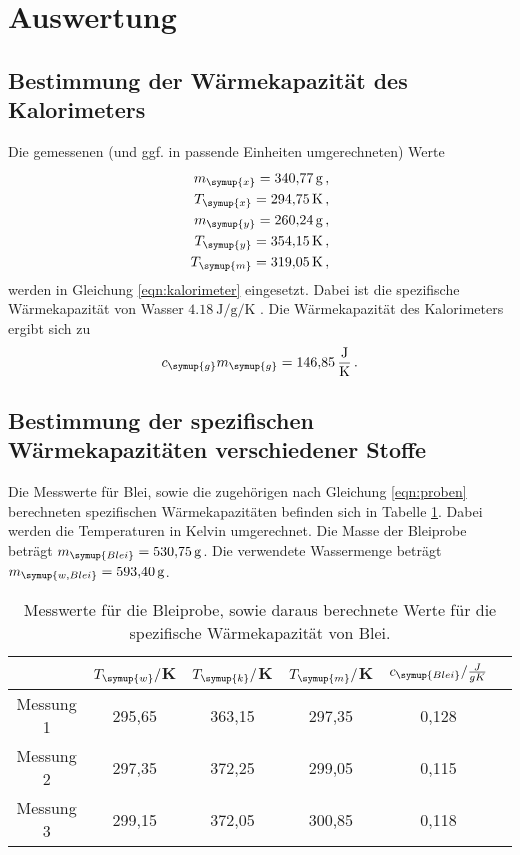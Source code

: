 \section{Auswertung}
\label{sec:Auswertung}

\subsection{Bestimmung der Wärmekapazität des Kalorimeters}
\label{sec:Auswertung_Kalorimeter}

Die gemessenen (und ggf. in passende Einheiten umgerechneten) Werte
\begin{align*}
  m_{\symup{x}} = \SI{340.77}{\gram}   \,,\\
  T_{\symup{x}} = \SI{294.75}{\kelvin} \,,\\
  m_{\symup{y}} = \SI{260.24}{\gram}   \,,\\
  T_{\symup{y}} = \SI{354.15}{\kelvin} \,,\\
  T_{\symup{m}} = \SI{319.05}{\kelvin} \,,\\
\end{align*}
werden in Gleichung \eqref{eqn:kalorimeter} eingesetzt. Dabei ist die spezifische Wärmekapazität
von Wasser $\SI{4.18}{\joule\per\gram\per\kelvin}$ \cite{Versuchsanleitung}. Die Wärmekapazität
des Kalorimeters ergibt sich zu
\begin{equation}
  c_{\symup{g}}m_{\symup{g}} = \SI{146.85}{\joule\per\kelvin} \,.\nonumber
\end{equation}


\subsection{Bestimmung der spezifischen Wärmekapazitäten verschiedener Stoffe}
\label{sec:Auswertung_stoffe}

Die Messwerte für Blei, sowie die zugehörigen  nach Gleichung \ref{eqn:proben} berechneten spezifischen Wärmekapazitäten
befinden sich in Tabelle \ref{tab:blei}. Dabei werden die Temperaturen in Kelvin umgerechnet.
Die Masse der Bleiprobe beträgt $m_{\symup{Blei}}=\SI{530.75}{\gram}$. Die verwendete
Wassermenge beträgt $m_{\symup{w,Blei}}=\SI{593.40}{\gram}$.

\begin{table}[H]
  \centering
  \caption{Messwerte für die Bleiprobe, sowie daraus berechnete Werte für die spezifische
  Wärmekapazität von Blei.}
  \label{tab:blei}
  \begin{tabular}{c c c c c c}
    \toprule
    & $T_{\symup{w}}/$K & $T_{\symup{k}}/$K & $T_{\symup{m}}/$K & $c_{\symup{Blei}}/\frac{J}{g K}$ \\
    \midrule
    Messung 1 & 295,65 & 363,15 & 297,35 & 0,128 \\
    Messung 2 & 297,35 & 372,25 & 299,05 & 0,115 \\
    Messung 3 & 299,15 & 372,05 & 300,85 & 0,118 \\
    \bottomrule
  \end{tabular}
\end{table}

